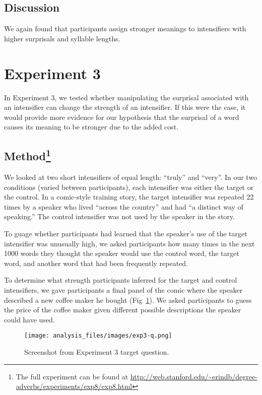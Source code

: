 \documentclass[10pt,letterpaper]{article}
\begin{document}
\subsection{Discussion}

We again found that participants assign stronger meanings to intensifiers with higher surprisals and syllable lengths.

\section{Experiment 3}

In Experiment 3, we tested whether manipulating the surprisal associated with an intensifier can change the strength of an intensifier. If this were the case, it would provide more evidence for our hypothesis that the surprisal of a word causes its meaning to be stronger due to the added cost.

\subsection{Method\footnote{The full experiment can be found at \url{http://web.stanford.edu/~erindb/degree-adverbs/experiments/exp8/exp8.html}}}

We looked at two short intensifiers of equal length: ``truly'' and ``very''. In our two conditions (varied between participants), each intensifier was either the target or the control. In a comic-style training story, the target intensifier was repeated 22 times by a speaker who lived ``across the country'' and had ``a distinct way of speaking.'' The control intensifier was not used by the speaker in the story.

To guage whether participants had learned that the speaker's use of the target intensifier was unusually high, we asked participants how many times in the next 1000 words they thought the speaker would use the control word, the target word, and another word that had been frequently repeated.

To determine what strength participants inferred for the target and control intensifiers, we gave participants a final panel of the comic where the speaker described a new coffee maker he bought (Fig~\ref{exp3-q}). We asked participants to guess the price of the coffee maker given different possible descriptions the speaker could have used.

\begin{figure}[ht]
\begin{center}
\texttt{[image: analysis\_files/images/exp3-q.png]}
\end{center}
\caption{Screenshot from Experiment 3 target question.} 
\label{exp3-q}
\end{figure}
\end{document}

